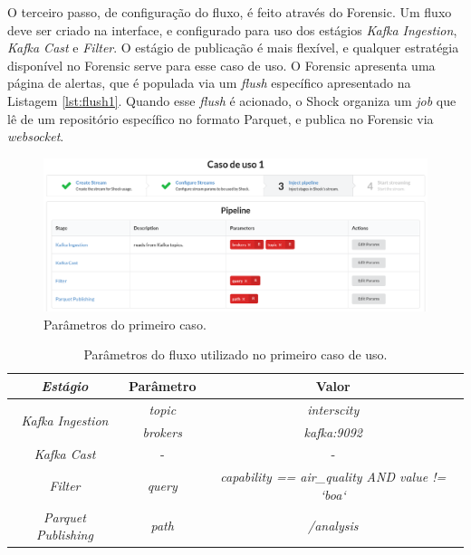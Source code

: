 O terceiro passo, de configuração do fluxo, é feito através do Forensic.
Um fluxo deve ser criado na interface, e configurado para uso dos
estágios \textit{Kafka Ingestion}, \textit{Kafka Cast} e \textit{Filter}.
O estágio de publicação é mais flexível, e qualquer
estratégia disponível no Forensic serve para esse caso de uso. O Forensic
apresenta uma página de alertas, que é populada via um \textit{flush}
específico apresentado na Listagem \ref{lst:flush1}. Quando esse
\textit{flush} é acionado, o Shock organiza um \textit{job}
que lê de um repositório específico no formato Parquet, e publica no Forensic
via \textit{websocket}.

\begin{figure}[hbt]
  \centering
  \includegraphics[width=\textwidth]{figuras/parametros.png}
  \caption{Parâmetros do primeiro caso.}
  \label{fig:case1}
\end{figure}

\begin{table}[hbt]
    \centering
    \caption{Parâmetros do fluxo utilizado no primeiro caso de uso.}
    \label{tab:case1}
    \begin{tabular}{|c|c|c|}
        \hline
        \textit{\textbf{Estágio}}                   & \textbf{Parâmetro} & \textbf{Valor}                                         \\ \hline
        \multirow{2}{*}{\textit{Kafka Ingestion}} & \textit{topic}     & \textit{interscity}                                    \\ \cline{2-3} 
                                                  & \textit{brokers}   & \textit{kafka:9092}                                    \\ \hline
                                                  \textit{Kafka Cast}                       & -                  & -                                                      \\ \hline
                                                  \textit{Filter}                           & \textit{query}     & \textit{capability == air\_quality AND value != `boa`} \\ \hline
                                                  \textit{Parquet Publishing}               & \textit{path}      & \textit{/analysis}                                     \\ \hline
    \end{tabular}
\end{table}

